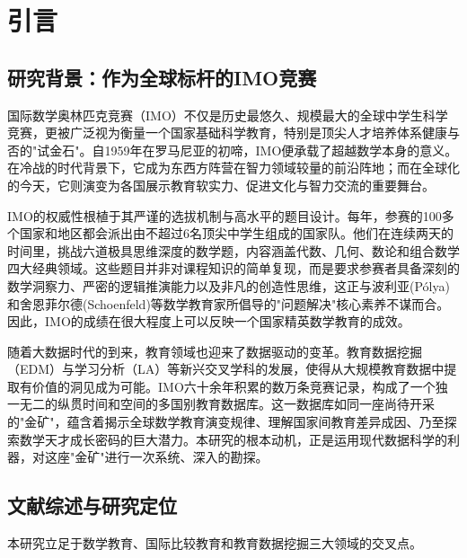 \documentclass[12pt,a4paper]{article}
\begin{document}
\vspace{0.5em}


\clearpage
\tableofcontents
\clearpage

\section{引言}

\subsection{研究背景：作为全球标杆的IMO竞赛}

国际数学奥林匹克竞赛（IMO）不仅是历史最悠久、规模最大的全球中学生科学竞赛，更被广泛视为衡量一个国家基础科学教育，特别是顶尖人才培养体系健康与否的"试金石"\cite{imo_history}。自1959年在罗马尼亚的初啼，IMO便承载了超越数学本身的意义。在冷战的时代背景下，它成为东西方阵营在智力领域较量的前沿阵地；而在全球化的今天，它则演变为各国展示教育软实力、促进文化与智力交流的重要舞台\cite{imo_official}。

IMO的权威性根植于其严谨的选拔机制与高水平的题目设计。每年，参赛的100多个国家和地区都会派出由不超过6名顶尖中学生组成的国家队\cite{mathematical_olympiad_training}。他们在连续两天的时间里，挑战六道极具思维深度的数学题，内容涵盖代数、几何、数论和组合数学四大经典领域。这些题目并非对课程知识的简单复现，而是要求参赛者具备深刻的数学洞察力、严密的逻辑推演能力以及非凡的创造性思维，这正与波利亚(Pólya)和舍恩菲尔德(Schoenfeld)等数学教育家所倡导的"问题解决"核心素养不谋而合\cite{polya1945solve,schoenfeld1985mathematical}。因此，IMO的成绩在很大程度上可以反映一个国家精英数学教育的成效。

随着大数据时代的到来，教育领域也迎来了数据驱动的变革。教育数据挖掘（EDM）与学习分析（LA）等新兴交叉学科的发展，使得从大规模教育数据中提取有价值的洞见成为可能\cite{educational_data_mining,learning_analytics}。IMO六十余年积累的数万条竞赛记录，构成了一个独一无二的纵贯时间和空间的多国别教育数据库。这一数据库如同一座尚待开采的"金矿"，蕴含着揭示全球数学教育演变规律、理解国家间教育差异成因、乃至探索数学天才成长密码的巨大潜力。本研究的根本动机，正是运用现代数据科学的利器，对这座"金矿"进行一次系统、深入的勘探。

\subsection{文献综述与研究定位}

本研究立足于数学教育、国际比较教育和教育数据挖掘三大领域的交叉点。
\end{document}
